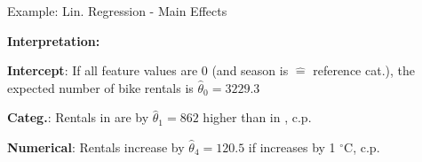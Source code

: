 \documentclass[10pt,compress,t,notes=noshow,xcolor=table]{beamer}
\begin{document}
\begin{framev}[align=top]{Example: Lin. Regression - Main Effects}
{\begin{scriptsize}
\end{scriptsize}
\spacer[0]
}
\pause
%
\textbf{Interpretation:}
\begin{itemizeM}
\item<+-> \textbf{Intercept}: If all feature values are 0 (and season is  $\hat =$ reference cat.), the expected number of bike rentals is $\hat\theta_0 = 3229.3$
\item<+-> \textbf{Categ.}: Rentals in  are by $\hat\theta_1 = 862$ higher than in , c.p.
\item<+-> \textbf{Numerical}: Rentals increase by $\hat\theta_4 = 120.5$ if  increases by 1 $^\circ$C, c.p.
\end{itemizeM}
\end{framev}

\endlecture
\end{document}
